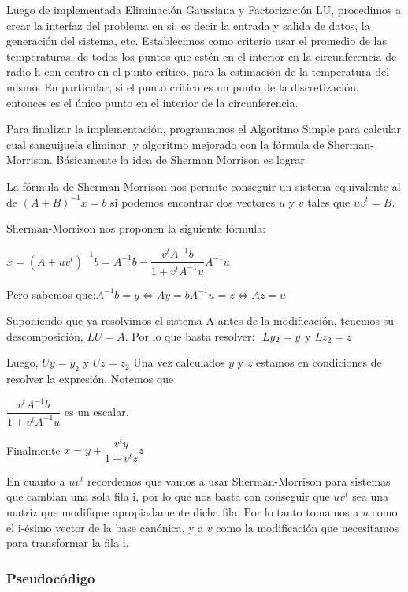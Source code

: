 Luego de implementada Eliminación Gaussiana y Factorizaci\'on LU, procedimos a crear la interfaz del problema en si, es decir la entrada y salida de datos, la generación del sistema, etc. Establecimos como criterio usar el promedio de las temperaturas, de todos los puntos que estén en el interior en la circunferencia de radio h con centro en el punto crítico, para la estimación de la temperatura del mismo. En particular, si el punto critico es un punto de la discretizaci\'on, entonces es el único punto en el interior de la circunferencia.


Para finalizar la implementación, programamos el Algoritmo Simple para calcular cual sanguijuela eliminar, y algoritmo mejorado con la fórmula de Sherman-Morrison. Básicamente la idea de Sherman Morrison es lograr 

La fórmula de Sherman-Morrison nos permite conseguir un sistema equivalente al de $(A+B)^{-1}x=b$ si podemos encontrar dos vectores $u$ y $v$ tales que $uv^t=B$.

Sherman-Morrison nos proponen la siguiente fórmula:

$x = (A + uv^{t})^{-1} b = A^{-1}b -  \dfrac{v^{t}A^{-1}b}{1+v^{t}A^{-1}u} A^{-1}u$

Pero sabemos que:$A^{-1}b = y \iff Ay = b 
A^{-1}u = z \iff Az = u $

Suponiendo que ya resolvimos el sistema A antes de la modificación, tenemos su descomposición, $ LU=A $. Por lo que basta resolver: $\\\
Ly_{2} = y $ y $ Lz_{2}=z$

Luego, $ Uy=y_{2} $ y $ Uz=z_{2}$
Una vez calculados $ y $ y $ z $ estamos en condiciones de resolver la expresión. Notemos que

$ \dfrac{v^{t}A^{-1}b}{1+v^{t}A^{-1}u} $ es un escalar.

Finalmente $ x = y +  \dfrac{v^{t}y}{1+v^{t}z} z$


En cuanto a $ uv^{t} $ recordemos que vamos a usar Sherman-Morrison para sistemas que cambian una sola fila i, por lo que nos basta con
conseguir que $ uv^{t} $ sea una matriz que modifique apropiadamente dicha fila. Por lo tanto tomamos a $u$ como el i-ésimo vector de la base canónica,
y a $v$ como la modificación que necesitamos para transformar la fila i.

\subsubsection{Pseudocódigo}


